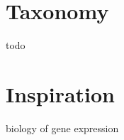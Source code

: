 \documentclass[a4paper, 11pt]{article}
\begin{document}
\section{Taxonomy}
\label{sec:taxonomy}
todo

\section{Inspiration}
\label{sec:inspiration}

biology of gene expression

\end{document}
